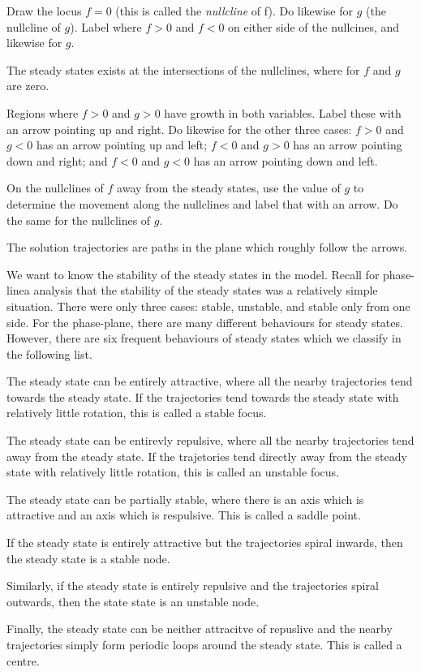 \documentclass[fleqn,letterpaper]{report}
\begin{document}
\begin{smallitemize}
\item Draw the locus $f = 0$ (this is called the
\emph{nullcline} of f). Do likewise for $g$ (the nullcline of
$g$). Label where $f>0$ and $f<0$ on either side of the
nullcines, and likewise for $g$.
\item The steady states exists at the intersections of the
nullclines, where for $f$ and $g$ are zero.
\item Regions where $f>0$ and $g>0$ have growth in both
variables. Label these with an arrow pointing up and right.
Do likewise for the other three cases: $f>0$ and $g<0$ has an
arrow pointing up and left; $f<0$ and $g>0$ has an arrow
pointing down and right; and $f<0$ and $g<0$ has an arrow
pointing down and left. 
\item On the nullclines of $f$ away from the steady states,
use the value of $g$ to determine the movement along the
nullclines and label that with an arrow. Do the same for the
nullclines of $g$.
\item The solution trajectories are paths in the plane which
roughly follow the arrows. 
\end{smallitemize}

We want to know the stability of the steady states in the
model. Recall for phase-linea analysis that the stability of
the steady states was a relatively simple situation. There
were only three cases: stable, unstable, and stable only from
one side. For the phase-plane, there are many different
behaviours for steady states. However, there are six frequent
behaviours of steady states which we classify in the following
list.  

\begin{smallitemize}
\item The steady state can be entirely attractive, where all
the nearby trajectories tend towards the steady state. If the
trajectories tend towards the steady state with relatively
little rotation, this is called a stable focus.
\item The steady state can be entirevly repulsive, where all
the nearby trajectories tend away from the steady state. If
the trajetories tend directly away from the steady state with
relatively little rotation, this is called an unstable focus.
\item The steady state can be partially stable, where there is
an axis which is attractive and an axis which is respulsive.
This is called a saddle point.
\item If the steady state is entirely attractive but the
trajectories spiral inwards, then the steady state is a stable
node.
\item Similarly, if the steady state is entirely repulsive and
the trajectories spiral outwards, then the state state is an
unstable node.
\item Finally, the steady state can be neither attracitve of
repuslive and the nearby trajectories simply form periodic
loops around the steady state. This is called a centre.
\end{smallitemize}
\end{document}
